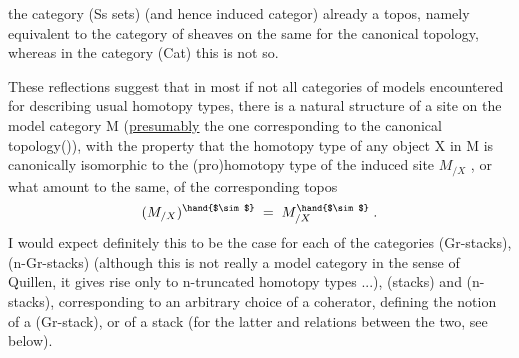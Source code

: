 
the category  (Ss sets) (and hence  induced categor)  already
a topos,  namely equivalent to the category of sheaves on the same for
the canonical topology,  whereas in the category (Cat)  this is not so.

These reflections suggest that in most if not all categories of
models encountered for describing usual homotopy types,  there is a 
natural structure of a site on the model category M (\uline{presumably} the one
corresponding to the canonical topology()), with the property that the
homotopy type of any object X in M is  canonically isomorphic to the
(pro)homotopy type of the induced site $M_{/X}$ ,  or what amount to the same,
of the corresponding topos
\[ (M_{/X})^{\hand{$\sim$}} \;=\; M^{\hand{$\sim$}}_{/X} \;. \]
I would expect definitely this to be the case for each of the categories
(Gr-stacks), (n-Gr-stacks) (although this is not really a model category
in the sense of Quillen, it gives rise only to n-truncated homotopy
types ...),  (stacks)  and (n-stacks),  corresponding to an arbitrary \margin{$\lceil$}
choice of a coherator,  defining the notion of a (Gr-stack),  or of a \margin{$[$}
stack  (for the latter and relations between the two,  see below). \margin{$\lfloor$}


